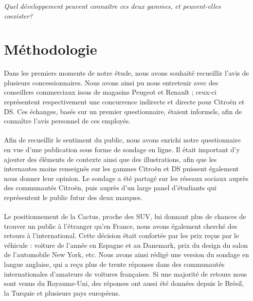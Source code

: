 \documentclass[12pt]{article}\usepackage[]{graphicx}\usepackage[]{color}
\begin{document}
\noindent \emph{Quel développement peuvent connaître ces deux gammes, et
	peuvent-elles coexister?}

\break
\section{Méthodologie}

\paragraph{} Dans les premiers moments de notre étude, nous avons souhaité recueillir
l'avis de plusieurs concessionnaires. Nous avons ainsi pu nous entretenir avec des
conseillers commerciaux issus de magasins Peugeot et Renault ; ceux-ci représentent
respectivement une concurrence indirecte et directe pour Citroën et DS. Ces échanges,
basés sur un premier questionnaire, étaient informels, afin de connaître l'avis personnel
de ces employés.

\paragraph{} Afin de recueillir le sentiment du public, nous avons enrichi notre
questionnaire en vue d'une publication sous forme de sondage en ligne. Il était
important d'y ajouter des éléments de contexte ainsi que des illustrations, afin que
les internautes moins renseignés sur les gammes Citroën et DS puissent également nous donner
leur opinion. Le sondage a été partagé sur les réseaux sociaux auprès des communautés Citroën,
puis auprès d'un large panel d'étudiants qui représentent le public futur des deux marques.

\paragraph{} Le positionnement de la Cactus, proche des SUV, lui donnant plus
de chances de trouver un public à l'étranger qu'en France, nous avons également
cherché des retours à l'international. Cette décision était confortée par les
prix reçus par le véhicule : voiture de l'année en Espagne et au Danemark, prix
du design du salon de l'automobile New York, etc. Nous avons ainsi rédigé une version du
sondage en langue anglaise, qui a reçu plus de trente réponses dans des communautés
internationales d'amateurs de voitures françaises. Si une majorité
de retours nous sont venus du Royaume-Uni, des réponses ont aussi été données
depuis le Brésil, la Turquie et plusieurs pays européens.\\
\end{document}
